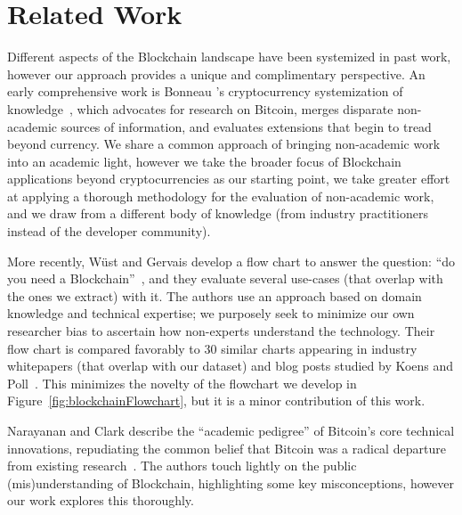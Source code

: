 
\section{Related Work}
\label{sec:related-works}

Different aspects of the Blockchain landscape have been systemized in past work, however our approach provides a unique and complimentary perspective. An early comprehensive work is Bonneau \etal's cryptocurrency systemization of knowledge~\cite{BMC+15}, which advocates for research on Bitcoin, merges disparate non-academic sources of information, and evaluates extensions that begin to tread beyond currency. We share a common approach of bringing non-academic work into an academic light, however we take the broader focus of Blockchain applications beyond cryptocurrencies as our starting point, we take greater effort at applying a thorough methodology for the evaluation of non-academic work, and we draw from a different body of knowledge (\ie from industry practitioners instead of the developer community).

More recently, W{\"u}st and Gervais develop a flow chart to answer the question: ``do you need a Blockchain''~\cite{Wust17}, and they evaluate several use-cases (that overlap with the ones we extract) with it. The authors use an approach based on domain knowledge and technical expertise; we purposely seek to minimize our own researcher bias to ascertain how non-experts understand the technology. Their flow chart is compared favorably to 30 similar charts appearing in industry whitepapers (that overlap with our dataset) and blog posts studied by Koens and Poll~\cite{}. This minimizes the novelty of the flowchart we develop in Figure~\ref{fig:blockchainFlowchart}, but it is a minor contribution of this work. 

Narayanan and Clark describe the ``academic pedigree'' of Bitcoin's core technical innovations, repudiating the common belief that Bitcoin was a radical departure from existing research~\cite{Narayanan17}. The authors touch lightly on the public (mis)understanding of Blockchain, highlighting some key misconceptions, however our work explores this thoroughly.


